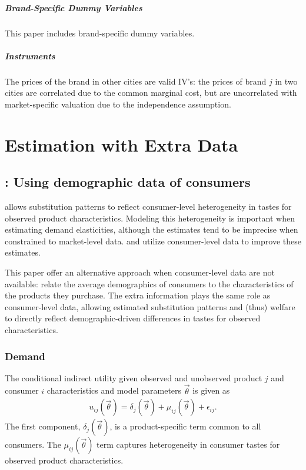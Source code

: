 \documentclass[11pt]{elegantbook}
\begin{document}
\paragraph*{Brand-Specific Dummy Variables} This paper includes brand-specific dummy variables.

\paragraph*{Instruments}
The prices of the brand in other cities are valid IV's: the prices of brand $j$ in two cities are correlated due to the common marginal cost, but are uncorrelated with market-specific valuation due to the independence assumption.

\chapter{Estimation with Extra Data}
\section{\cite{petrin2002quantifying}: Using demographic data of consumers}
\cite{berry1995automobile} allows substitution patterns to reflect consumer-level heterogeneity in tastes for observed product characteristics. Modeling this heterogeneity is important when estimating demand elasticities, although the estimates tend to be imprecise when constrained to market-level data. \cite{goldberg1995product} and \cite{berry2004differentiated} utilize consumer-level data to improve these estimates.

This paper offer an alternative approach when consumer-level data are not available: relate the average demographics of consumers to the characteristics of the products they purchase. The extra information plays the same role as consumer-level data, allowing estimated substitution patterns and (thus) welfare to directly reflect demographic-driven differences in tastes for observed characteristics.


\subsection{Demand}
The conditional indirect utility given observed and unobserved product $j$ and consumer $i$ characteristics and model parameters $\vec{\theta}$ is given as
\begin{equation}
    \begin{aligned}
        u_{ij}(\vec{\theta})=\delta_j(\vec{\theta})+\mu_{ij}(\vec{\theta})+\epsilon_{ij}.
    \end{aligned}
    \nonumber
\end{equation}
The first component, $\delta_j(\vec{\theta})$, is a product-specific term common to all consumers. The $\mu_{ij}(\vec{\theta})$ term captures heterogeneity in consumer tastes for observed product characteristics.
\end{document}
